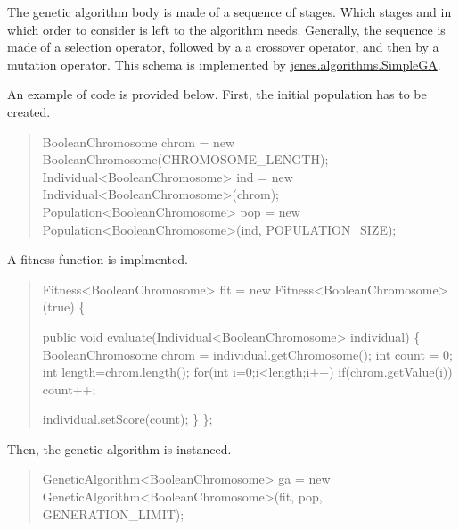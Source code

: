 The genetic algorithm body is made of a sequence of stages. Which stages and in which order to consider is left to the algorithm needs. Generally, the sequence is made of a selection operator, followed by a a crossover operator, and then by a mutation operator. This schema is implemented by \hyperlink{}{jenes.\-algorithms.\-Simple\-G\-A}. 

An example of code is provided below. First, the initial population has to be created. 

\begin{quotation}



\begin{DoxyPre}
BooleanChromosome chrom = new BooleanChromosome(CHROMOSOME\_LENGTH);
Individual<BooleanChromosome> ind = new Individual<BooleanChromosome>(chrom);
Population<BooleanChromosome> pop = new Population<BooleanChromosome>(ind,
        POPULATION\_SIZE);
\end{DoxyPre}


\end{quotation}


A fitness function is implmented.

\begin{quotation}

\begin{DoxyPre}
Fitness<BooleanChromosome> fit = new Fitness<BooleanChromosome>(true) \{\end{DoxyPre}



\begin{DoxyPre}    
    public void evaluate(Individual<BooleanChromosome> individual) \{
        BooleanChromosome chrom = individual.getChromosome();
        int count = 0;
        int length=chrom.length();
        for(int i=0;i<length;i++)
            if(chrom.getValue(i))
                count++;\end{DoxyPre}



\begin{DoxyPre}            individual.setScore(count);
         \}           
    \};
\end{DoxyPre}
 \end{quotation}


Then, the genetic algorithm is instanced. 

\begin{quotation}



\begin{DoxyPre}
GeneticAlgorithm<BooleanChromosome> ga = new GeneticAlgorithm<BooleanChromosome>(fit, pop, GENERATION\_LIMIT);
\end{DoxyPre}


\end{quotation}


